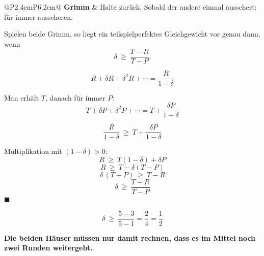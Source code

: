 \begin{merksatz}
\begin{center}
{\small
\renewcommand{\arraystretch}{1.5}
\begin{tabular}{@{}P{2.4cm}P{6.2cm}@{}}
\toprule
\textbf{Grimm} & Halte zurück. Sobald der andere einmal ausschert: für immer ausscheren.\\
\bottomrule
\end{tabular}}
\end{center}

Spielen beide Grimm, so liegt ein teilspielperfektes Gleichgewicht vor genau dann, wenn
\[ \delta \ \ge\ \frac{T-R}{T-P} . \]

\[ R + \delta R + \delta^{2} R + \cdots = \frac{R}{1-\delta} \]

 Man erhält $T$, danach für immer $P$:
\[ T + \delta P + \delta^{2} P + \cdots = T + \frac{\delta P}{1-\delta} \]

\[ \frac{R}{1-\delta} \ \ge\ T + \frac{\delta P}{1-\delta} \]

Multiplikation mit $(1-\delta) > 0$:
\[ R \ \ge\ T(1-\delta) + \delta P \]
\[ R \ \ge\ T - \delta(T-P) \]
\[ \delta\,(T-P) \ \ge\ T-R \]
\[ \delta \ \ge\ \frac{T-R}{T-P} \]
$\blacksquare$

\[ \delta \ \ge\ \frac{5-3}{5-1} = \frac24 = \frac12 \]

\begin{center}
\begin{minipage}{0.9\textwidth}
\textbf{Die beiden Häuser müssen nur damit rechnen, dass es im Mittel noch zwei Runden weitergeht.}
\end{minipage}
\end{center}

\begin{center}
\begin{minipage}{0.88\textwidth}
\end{minipage}
\end{center}
\end{merksatz}

